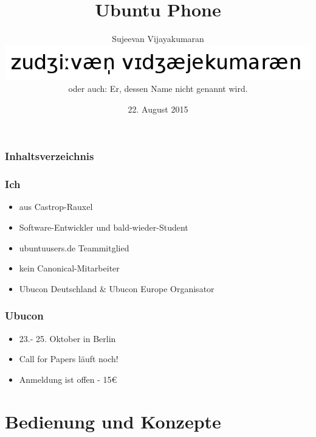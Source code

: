 \documentclass{beamer}
\title{Ubuntu Phone}
\author[Sujeevan Vijayakumaran]{Sujeevan Vijayakumaran\\
\includegraphics[width=0.3\linewidth]{images/name.png}\\
\tiny{oder auch: Er, dessen Name nicht genannt wird.}}
\date{22. August 2015}
\institute{FrOSCon}
\begin{document}
\maketitle
\begin{frame}
  \frametitle{Inhaltsverzeichnis}
  \tableofcontents
\end{frame}

\begin{frame}
  \frametitle{Ich}
  \begin{itemize}
    \item aus Castrop-Rauxel
    \item Software-Entwickler und bald-wieder-Student
    \item ubuntuusers.de Teammitglied
    \item kein Canonical-Mitarbeiter
    \item Ubucon Deutschland \& Ubucon Europe Organisator
  \end{itemize}
\end{frame}

\begin{frame}
  \frametitle{Ubucon}
  \begin{itemize}
    \item 23.- 25. Oktober in Berlin
    \item Call for Papers läuft noch!
    \item Anmeldung ist offen - 15€
  \end{itemize}
\end{frame}

\section{Bedienung und Konzepte}

\frame{\sectionpage}
\end{document}

